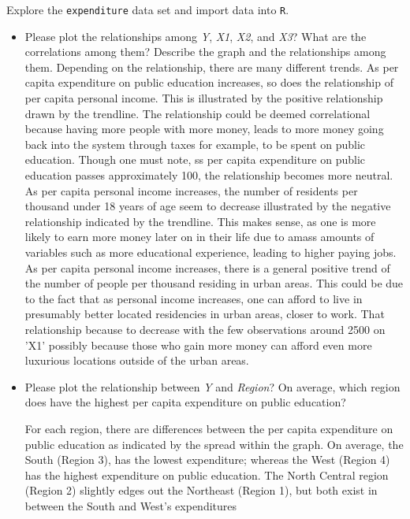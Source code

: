 \documentclass[12pt,letterpaper]{article}
\begin{document}
{{\vspace{.5cm}
\noindent Explore the \texttt{expenditure} data set and import data into \texttt{R}.
\vspace{.5cm}
  
\vspace{.5cm}
\begin{itemize}

\item
Please plot the relationships among \emph{Y}, \emph{X1}, \emph{X2}, and \emph{X3}? What are the correlations among them? Describe the graph and the relationships among them.
\vspace{.5cm}
Depending on the relationship, there are many different trends.
As per capita expenditure on public education increases, so does the relationship of per capita personal income. This is illustrated by the positive relationship drawn by the trendline. The relationship could be deemed correlational because having more people with more money, leads to more money going back into the system through taxes for example, to be spent on public education. Though one must note, ss per capita expenditure on public education passes approximately 100, the relationship becomes more neutral.
As per capita personal income increases, the number of residents per thousand under 18 years of age seem to decrease illustrated by the negative relationship indicated by the trendline. This makes sense, as one is more likely to earn more money later on in their life due to amass amounts of variables such as more educational experience, leading to higher paying jobs. 
As per capita personal income increases, there is a general positive trend of the number of people per thousand residing in urban areas. This could be due to the fact that as personal income increases, one can afford to live in presumably better located residencies in urban areas, closer to work. That relationship because to decrease with the few observations around 2500 on 'X1' possibly because those who gain more money can afford even more luxurious locations outside of the urban areas. 

\item
Please plot the relationship between \emph{Y} and \emph{Region}? On average, which region does have the highest per capita expenditure on public education?
\vspace{.5cm}

For each region, there are differences between the per capita expenditure on public education as indicated by the spread within the graph. On average, the South (Region 3), has the lowest expenditure; whereas the West (Region 4) has the highest expenditure on public education. The North Central region (Region 2) slightly edges out the Northeast (Region 1), but both exist in between the South and West's expenditures


\end{itemize}}}
\end{document}
